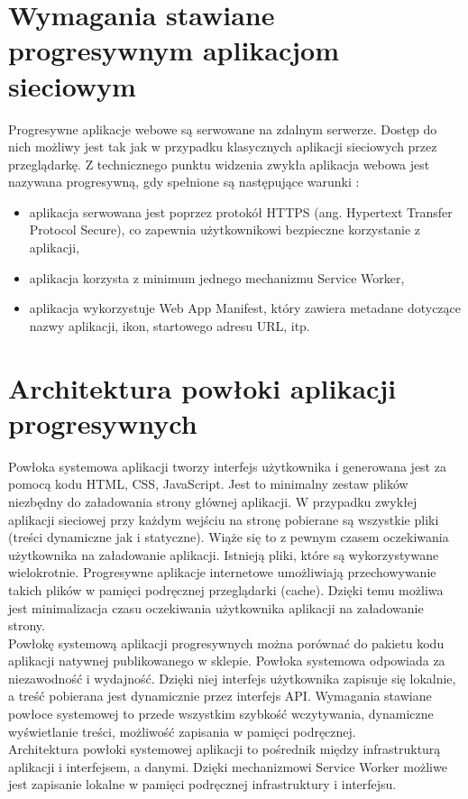 \documentclass[a4paper,12pt,twoside,openany]{report}
\begin{document}
\section{Wymagania stawiane progresywnym aplikacjom sieciowym}
Progresywne aplikacje webowe są serwowane na zdalnym serwerze. Dostęp do nich możliwy jest tak jak w przypadku klasycznych aplikacji sieciowych przez przeglądarkę. Z technicznego punktu widzenia zwykła aplikacja webowa jest nazywana progresywną, gdy spełnione są następujące warunki \cite{ieee}:
\begin{itemize}
\item{aplikacja serwowana jest poprzez protokół HTTPS (ang. Hypertext Transfer Protocol Secure), co zapewnia użytkownikowi bezpieczne korzystanie z aplikacji,}
\item{aplikacja korzysta z minimum jednego mechanizmu Service Worker,}
\item{aplikacja wykorzystuje Web App Manifest, który zawiera metadane dotyczące nazwy aplikacji, ikon, startowego adresu URL, itp.}
\end{itemize}

\section{Architektura powłoki aplikacji progresywnych}
\noindent Powłoka systemowa aplikacji tworzy interfejs użytkownika i generowana jest za pomocą kodu HTML, CSS, JavaScript. Jest to minimalny zestaw plików niezbędny do załadowania strony głównej aplikacji. W przypadku zwykłej aplikacji sieciowej przy każdym wej\'sciu na stronę pobierane są wszystkie pliki (tre\'sci dynamiczne jak i statyczne). Wiąże się to z pewnym czasem oczekiwania użytkownika na załadowanie aplikacji. Istnieją pliki, które są wykorzystywane wielokrotnie. Progresywne aplikacje internetowe umożliwiają przechowywanie takich plików w pamięci podręcznej przeglądarki (cache). Dzięki temu możliwa jest minimalizacja czasu oczekiwania użytkownika aplikacji na załadowanie strony. \\
Powłokę systemową aplikacji progresywnych można porównać do pakietu kodu aplikacji natywnej publikowanego w sklepie. Powłoka systemowa odpowiada za niezawodno\'sć i wydajno\'sć. Dzięki niej interfejs użytkownika zapisuje się lokalnie, a tre\'sć pobierana jest dynamicznie przez interfejs API. Wymagania stawiane powłoce systemowej to przede wszystkim szybko\'sć wczytywania, dynamiczne wy\'swietlanie tre\'sci, możliwo\'sć zapisania w pamięci podręcznej.\\
 Architektura powłoki systemowej aplikacji to po\'srednik między infrastrukturą aplikacji i interfejsem, a danymi.  Dzięki mechanizmowi Service Worker możliwe jest zapisanie lokalne w pamięci podręcznej infrastruktury i interfejsu.  \newline
\end{document}
